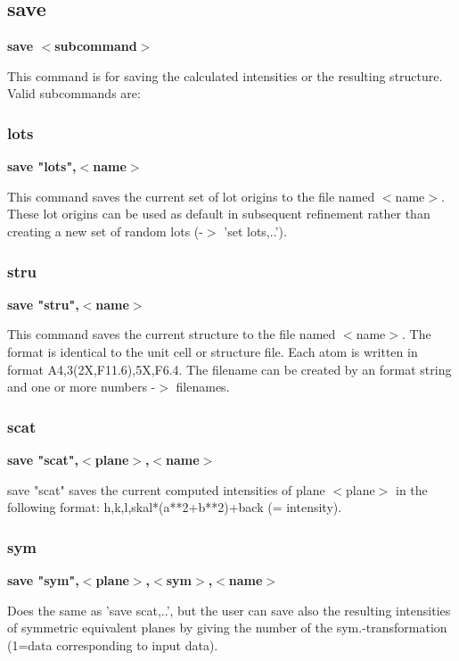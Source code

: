 \subsection*{save}
{\bf save $ <$subcommand$> $ \par }
\par
\vspace{3pt}
This command is for saving the calculated intensities or the 
resulting structure. Valid subcommands are: 
\par
\subsubsection{lots}
{\bf save "lots",$ <$name$> $ \par }
\par
\vspace{3pt}
This command saves the current set of lot origins to the file 
named $ <$name$> $. These lot origins can be used as default in subsequent 
refinement rather than creating a new set of random lots 
(-$> $ 'set lots,..'). 
\subsubsection{stru}
{\bf save "stru",$ <$name$> $ \par }
\par
\vspace{3pt}
This command saves the current structure to the file named $ <$name$> $. 
The format is identical to the unit cell or structure file. Each 
atom is written in format A4,3(2X,F11.6),5X,F6.4. The filename 
can be created by an format string and one or more numbers -$> $ filenames. 
\subsubsection{scat}
{\bf save "scat",$ <$plane$> $,$ <$name$> $ \par }
\par
\vspace{3pt}
save "scat" saves the current computed intensities of plane $ <$plane$> $ in 
the following format: h,k,l,skal*(a**2+b**2)+back (= intensity). 
\subsubsection{sym}
{\bf save "sym",$ <$plane$> $,$ <$sym$> $,$ <$name$> $ \par }
\par
\vspace{3pt}
Does the same as 'save scat,..', but the user can save also the resulting 
intensities of symmetric equivalent planes  by giving the number of the 
sym.-transformation (1=data corresponding to input data). 
